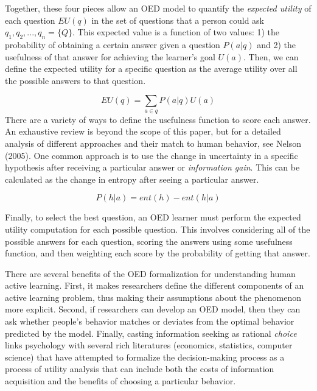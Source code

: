 \documentclass[a4paper,man,apacite,floatsintext]{apa6}
\begin{document}
Together, these four pieces allow an OED model to quantify the
\emph{expected utility} of each question \(EU(q)\) in the set of
questions that a person could ask \(q_1, q_2,..., q_n = \{Q\}\). This
expected value is a function of two values: 1) the probability of
obtaining a certain answer given a question \(P(a|q)\) and 2) the
usefulness of that answer for achieving the learner's goal \(U(a)\).
Then, we can define the expected utility for a specific question as the
average utility over all the possible answers to that question.

\[EU(q) = \sum_{a\in q}{P(a|q)U(a)}\] There are a variety of ways to
define the usefulness function to score each answer. An exhaustive
review is beyond the scope of this paper, but for a detailed analysis of
different approaches and their match to human behavior, see Nelson
(2005). One common approach is to use the change in uncertainty in a
specific hypothesis after receiving a particular answer or
\emph{information gain}. This can be calculated as the change in entropy
after seeing a particular answer.

\[P(h|a) = ent(h) - ent(h|a)\]

Finally, to select the best question, an OED learner must perform the
expected utility computation for each possible question. This involves
considering all of the possible answers for each question, scoring the
answers using some usefulness function, and then weighting each score by
the probability of getting that answer.

There are several benefits of the OED formalization for understanding
human active learning. First, it makes researchers define the different
components of an active learning problem, thus making their assumptions
about the phenomenon more explicit. Second, if researchers can develop
an OED model, then they can ask whether people's behavior matches or
deviates from the optimal behavior predicted by the model. Finally,
casting information seeking as rational \emph{choice} links psychology
with several rich literatures (economics, statistics, computer science)
that have attempted to formalize the decision-making process as a
process of utility analysis that can include both the costs of
information acquisition and the benefits of choosing a particular
behavior.
\end{document}

